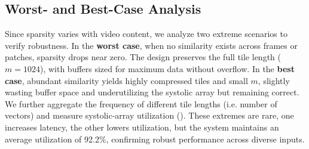 {\begin{table}[t]
    \centering
    \caption{Accuracy and Speedup on image VLMs}
\end{table}

\subsection{Worst- and Best-Case Analysis}
{Since sparsity varies with video content, we analyze two extreme scenarios to verify robustness.} {In the \textbf{worst case}, when no similarity exists across frames or patches, sparsity drops near zero. The design preserves the full tile length ($m=1024$), with buffers sized for maximum data without overflow.} {In the \textbf{best case}, abundant similarity yields highly compressed tiles and small $m$, slightly wasting buffer space and underutilizing the systolic array but remaining correct.} {We further aggregate the frequency of different tile lengths (i.e. number of vectors) and measure systolic-array utilization (). These extremes are rare, one increases latency, the other lowers utilization, but the system maintains an average utilization of 92.2\%, confirming robust performance across diverse inputs.
}


}
